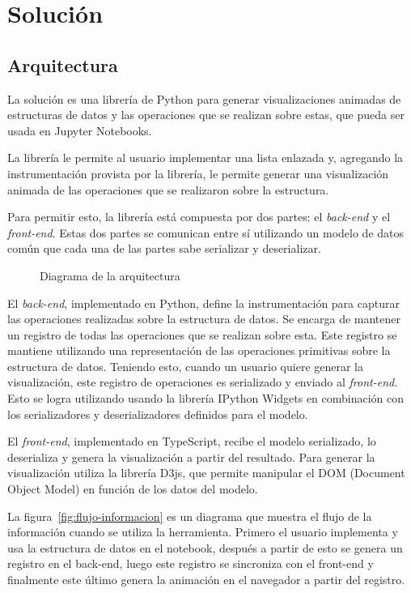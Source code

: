 \chapter{Solución}

\section{Arquitectura}

La solución es una librería de Python para generar visualizaciones animadas de estructuras de datos y las operaciones que se realizan sobre estas, que pueda ser usada en Jupyter Notebooks.

La librería le permite al usuario implementar una lista enlazada y, agregando la instrumentación provista por la librería, le permite generar una visualización animada de las operaciones que se realizaron sobre la estructura.

Para permitir esto, la librería está compuesta por dos partes: el \textit{back-end} y el \textit{front-end}. Estas dos partes se comunican entre sí utilizando un modelo de datos común que cada una de las partes sabe serializar y deserializar.

\begin{figure}[htb]
    \centering
    
    \caption{Diagrama de la arquitectura}
    \label{fig:diagrama-arq}
\end{figure}

El \textit{back-end}, implementado en Python, define la instrumentación para capturar las operaciones realizadas sobre la estructura de datos. Se encarga de mantener un registro de todas las operaciones que se realizan sobre esta. Este registro se mantiene utilizando una representación de las operaciones primitivas sobre la estructura de datos. Teniendo esto, cuando un usuario quiere generar la visualización, este registro de operaciones es serializado y enviado al \textit{front-end}. Esto se logra utilizando usando la librería IPython Widgets en combinación con los serializadores y deserializadores definidos para el modelo.

El \textit{front-end}, implementado en TypeScript, recibe el modelo serializado, lo deserializa y genera la visualización a partir del resultado. Para generar la visualización utiliza la librería D3js, que permite manipular el DOM (Document Object Model) en función de los datos del modelo.

La figura~\ref{fig:flujo-informacion} es un diagrama que muestra el flujo de la información cuando se utiliza la herramienta. Primero el usuario implementa y usa la estructura de datos en el notebook, después a partir de esto se genera un registro en el back-end, luego este registro se sincroniza con el front-end y finalmente este último genera la animación en el navegador a partir del registro.

